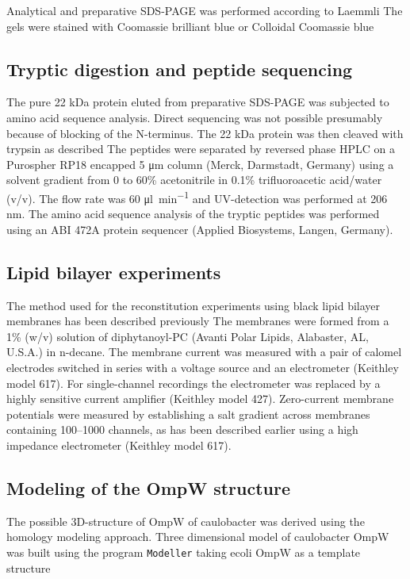 Analytical and preparative \ac{SDS-PAGE} was performed according to Laemmli The gels were stained with Coomassie brilliant blue or Colloidal Coomassie blue 

\subsection{Tryptic digestion and peptide sequencing}
\label{sub:porin_tryptic}
The pure 22 kDa protein eluted from preparative \ac{SDS-PAGE} was subjected to amino acid sequence analysis. Direct sequencing was not possible presumably because of blocking of the N-terminus. The 22 kDa protein was then cleaved with trypsin as described The peptides were separated by reversed phase HPLC on a Purospher RP18 encapped 5 \si{\micro\metre} column (Merck, Darmstadt, Germany) using a solvent gradient from 0 to 60\% acetonitrile in 0.1\% trifluoroacetic acid/water (v/v). The flow rate was 60 \si{\micro\litre\per\minute} and UV-detection was performed at 206 \si{\nano\metre}. The amino acid sequence analysis of the tryptic peptides was performed using an ABI 472A protein sequencer (Applied Biosystems, Langen, Germany).

\subsection{Lipid bilayer experiments}
\label{sub:porin_bilayer}
The method used for the reconstitution experiments using black lipid bilayer
membranes has been described previously The
membranes were formed from a 1\% (w/v) solution of diphytanoyl-\ac{PC} (Avanti
Polar Lipids, Alabaster, AL, U.S.A.) in n-decane. The membrane current was
measured with a pair of calomel electrodes switched in series with a voltage
source and an electrometer (Keithley model 617). For single-channel recordings the electrometer was replaced by a highly sensitive current amplifier (Keithley model 427). Zero-current membrane potentials were measured by establishing a salt gradient across membranes containing 100--1000 channels, as has been described earlier using a high impedance electrometer (Keithley model 617).

\subsection{Modeling of the OmpW structure}
\label{sub:porin_modeling}
The possible 3D-structure of OmpW of \ac{caulobacter} was derived using the homology modeling approach. Three dimensional model of \ac{caulobacter} OmpW was built using the program \texttt{Modeller} taking \ac{ecoli} OmpW as a template structure
 
